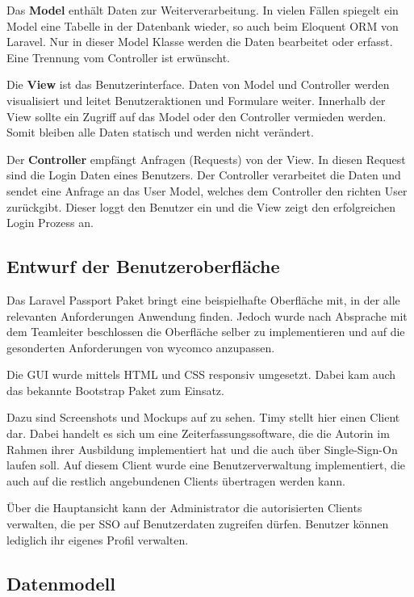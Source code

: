 Das \textbf{Model} enthält Daten zur Weiterverarbeitung. In vielen Fällen spiegelt ein Model
eine Tabelle in der Datenbank wieder, so auch beim Eloquent ORM von Laravel. Nur in dieser Model Klasse werden die Daten bearbeitet oder erfasst. Eine Trennung vom Controller ist erwünscht.

Die \textbf{View} ist das Benutzerinterface. Daten von Model und Controller werden visualisiert und leitet \zB Benutzeraktionen und Formulare weiter. Innerhalb der View sollte ein Zugriff auf das Model oder den Controller vermieden werden. Somit bleiben alle Daten statisch und werden nicht verändert.

Der \textbf{Controller} empfängt Anfragen (Requests) von der View. In diesen Request sind \bspw die Login Daten eines Benutzers. Der Controller verarbeitet die Daten und sendet eine Anfrage an das User Model, welches dem Controller den richten User zurückgibt. Dieser loggt den Benutzer ein und die View zeigt den erfolgreichen Login Prozess an. 



\subsection{Entwurf der Benutzeroberfläche}
\label{sec:Benutzeroberflaeche} 

Das Laravel Passport Paket bringt eine beispielhafte Oberfläche mit, in der alle relevanten Anforderungen Anwendung finden. Jedoch wurde nach Absprache mit dem Teamleiter beschlossen die Oberfläche selber zu implementieren und auf die gesonderten Anforderungen von wycomco  anzupassen.

Die \acs{GUI} wurde mittels \acs{HTML} und \acs{CSS} responsiv umgesetzt. Dabei kam auch das bekannte Bootstrap Paket zum Einsatz. 

Dazu sind Screenshots und Mockups auf   zu sehen. Timy stellt hier einen Client dar. Dabei handelt es sich um eine Zeiterfassungssoftware, die die Autorin im Rahmen ihrer Ausbildung implementiert hat und die auch über Single-Sign-On laufen soll. Auf diesem Client wurde eine Benutzerverwaltung implementiert, die auch auf die restlich angebundenen Clients übertragen werden kann. 

Über die Hauptansicht kann der Administrator die autorisierten Clients verwalten, die per \acs{SSO} auf  Benutzerdaten zugreifen dürfen. Benutzer können lediglich ihr eigenes Profil verwalten.

\subsection{Datenmodell}
\label{sec:Datenmodell}

